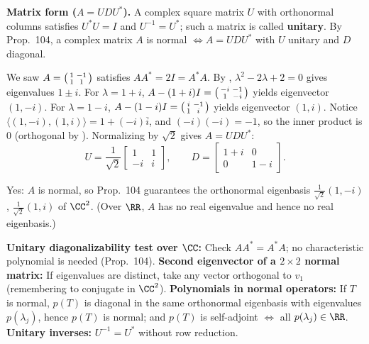 \documentclass[10pt]{scrartcl}
\begin{document}
\noindent\textbf{Matrix form ($A=UDU^*$).} A complex square matrix $U$ with orthonormal columns satisfies $U^*U=I$ and $U^{-1}=U^*$; such a matrix is called \textbf{unitary}. By Prop.~104, a complex matrix $A$ is normal $\iff A=UDU^*$ with $U$ unitary and $D$ diagonal.

\begin{example*}
  We saw $A=\begin{psmallmatrix}1&-1\\1&1\end{psmallmatrix}$ satisfies $AA^*=2I=A^*A$. By , $\lambda^2-2\lambda+2=0$ gives eigenvalues $1\pm i$.
  For $\lambda=1+i$, $A-(1+i)I=\begin{psmallmatrix}-i&-1\\1&-i\end{psmallmatrix}$ yields eigenvector $(1,-i)$.
  For $\lambda=1-i$, $A-(1-i)I=\begin{psmallmatrix}i&-1\\1&i\end{psmallmatrix}$ yields eigenvector $(1,i)$.
  Notice $\langle(1,-i),(1,i)\rangle = 1+(-i)\overline{i}$, and $(-i)(-i)=-1$, so the inner product is $0$ (orthogonal by ). Normalizing by $\sqrt{2}$ gives $A=UDU^*$:
  \[
    U = \frac{1}{\sqrt{2}}\begin{bmatrix}1&1\\-i&i\end{bmatrix}, \qquad
    D = \begin{bmatrix}1+i&0\\0&1-i\end{bmatrix}.
  \]
\end{example*}

\revisit Yes: $A$ is normal, so Prop.~104 guarantees the orthonormal eigenbasis $\frac{1}{\sqrt{2}}(1,-i)$, $\frac{1}{\sqrt{2}}(1,i)$ of $\CC^2$. (Over $\RR$, $A$ has no real eigenvalue and hence no real eigenbasis.)

\begin{shortcuts}
  \ii \textbf{Unitary diagonalizability test over $\CC$:} Check $AA^*=A^*A$; no characteristic polynomial is needed (Prop.~104).
  \ii \textbf{Second eigenvector of a $2\times2$ normal matrix:} If eigenvalues are distinct, take any vector orthogonal to $v_1$ (remembering to conjugate in $\CC^2$).
  \ii \textbf{Polynomials in normal operators:} If $T$ is normal, $p(T)$ is diagonal in the same orthonormal eigenbasis with eigenvalues $p(\lambda_j)$, hence $p(T)$ is normal; and $p(T)$ is self-adjoint $\iff$ all $p(\lambda_j)\in\RR$.
  \ii \textbf{Unitary inverses:} $U^{-1}=U^*$ without row reduction.
\end{shortcuts}
\end{document}
